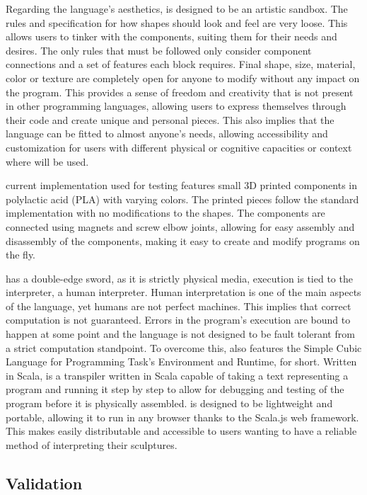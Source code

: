 Regarding the language's aesthetics, \sculpt is designed to be an artistic sandbox. The rules and specification for how shapes should look and feel are very loose. This allows users to tinker with the components, suiting them for their needs and desires.
The only rules that must be followed only consider component connections and a set of features each block requires. Final shape, size, material, color or texture are completely open for anyone to modify without any impact on the program.
This provides a sense of freedom and creativity that is not present in other programming languages, allowing users to express themselves through their code and create unique and personal pieces.
This also implies that the language can be fitted to almost anyone's needs, allowing accessibility and customization for users with different physical or cognitive capacities or context where \sculpt will be used.

\sculpt current implementation used for testing features small 3D printed components in polylactic acid (PLA) with varying colors.
The printed pieces follow the standard \sculpt implementation with no modifications to the shapes.
The components are connected using magnets and screw elbow joints, allowing for easy assembly and disassembly of the components, making it easy to create and modify programs on the fly.

\sculpt has a double-edge sword, as it is strictly physical media, execution is tied to the interpreter, a human interpreter.
Human interpretation is one of the main aspects of the language, yet humans are not perfect machines. This implies that correct computation is not guaranteed.
Errors in the program's execution are bound to happen at some point and the language is not designed to be fault tolerant from a strict computation standpoint.
To overcome this, \sculpt also features the Simple Cubic Language for Programming Task's Environment and Runtime, \sculpter for short.
Written in Scala, \sculpter is a transpiler written in Scala capable of taking a text representing a \sculpt program and running it step by step to allow for debugging and testing of the program before it is physically assembled.
\sculpter is designed to be lightweight and portable, allowing it to run in any browser thanks to the Scala.js web framework. This makes easily distributable and accessible to users wanting to have a reliable method of interpreting their sculptures.

\subsection{Validation}
\label{sec:methodology:validation}


